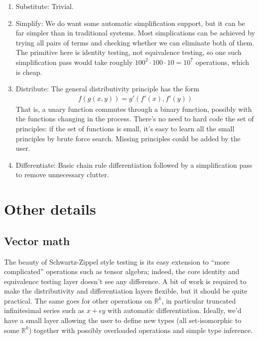 \documentclass[11pt]{article}
\newcommand{\R}{\mathbb{R}}
\newcommand{\blue}[1]{{\color{blue} #1}}
\begin{document}
\begin{enumerate}
\item \blue{Substitute:} Trivial.

\item \blue{Simplify:} We do want some automatic simplification support, but it can be far simpler than
in traditional systems.  Most simplications can be achieved by trying all pairs of terms and checking
whether we can eliminate both of them.  The primitive here is identity testing, not equivalence testing,
so one such simplification pass would take roughly $100^2 \cdot 100 \cdot 10 = 10^7$ operations, which
is cheap.

\item \blue{Distribute:} The general distributivity principle has the form
\begin{align*}
f(g(x,y)) = g'(f'(x),f'(y))
\end{align*}
That is, a unary function commutes through a binary function, possibly with the functions changing
in the process.  There's no need to hard code the set of principles: if the set of functions is small,
it's easy to learn all the small principles by brute force search.  Missing principles could be added
by the user.

\item \blue{Differentiate:} Basic chain rule differentiation followed by a simplification pass to remove
unnecessary clutter.
\end{enumerate}

\section{Other details}

\subsection{Vector math}

The beauty of Schwartz-Zippel style testing is its easy extension to ``more complicated'' operations such
as tensor algebra; indeed, the core identity and equivalence testing layer doesn't see any difference.
A bit of work is required to make the distributivity and differentiation layers flexible, but it should
be quite practical.  The same goes for other operations on $\R^k$, in particular truncated infinitesimal
series such as $x + \epsilon y$ with automatic differentiation.  Ideally, we'd have a small layer allowing
the user to define new types (all set-isomorphic to some $\R^k$) together with possibly overloaded
operations and simple type inference.
\end{document}
